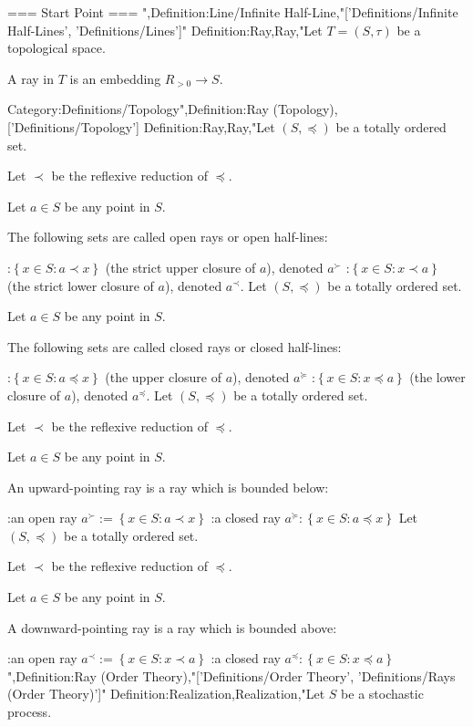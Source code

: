 === Start Point ===
",Definition:Line/Infinite Half-Line,"['Definitions/Infinite Half-Lines', 'Definitions/Lines']"
Definition:Ray,Ray,"Let $T = \left( S, \tau \right)$ be a topological space.


A ray in $T$ is an embedding $R_{>0} \to S$.

Category:Definitions/Topology",Definition:Ray (Topology),['Definitions/Topology']
Definition:Ray,Ray,"Let $\left( S, \preccurlyeq \right)$ be a totally ordered set.

Let $\prec$ be the reflexive reduction of $\preccurlyeq$.

Let $a \in S$ be any point in $S$.


The following sets are called open rays or open half-lines:

:$\left\lbrace x \in S: a \prec x \right\rbrace$ (the strict upper closure of $a$), denoted $a^\succ$
:$\left\lbrace x \in S: x \prec a \right\rbrace$ (the strict lower closure of $a$), denoted $a^\prec$.
Let $\left( S, \preccurlyeq \right)$ be a totally ordered set.

Let $a \in S$ be any point in $S$.


The following sets are called closed rays or closed half-lines:

:$\left\lbrace x \in S: a \preccurlyeq x \right\rbrace$ (the upper closure of $a$), denoted $a^\succcurlyeq$
:$\left\lbrace x \in S: x \preccurlyeq a \right\rbrace$ (the lower closure of $a$), denoted $a^\preccurlyeq$.
Let $\left( S, \preccurlyeq \right)$ be a totally ordered set.

Let $\prec$ be the reflexive reduction of $\preccurlyeq$.

Let $a \in S$ be any point in $S$.


An upward-pointing ray is a ray which is bounded below:

:an open ray $a^\succ:= \left\lbrace x \in S: a \prec x \right\rbrace$
:a closed ray $a^\succcurlyeq: \left\lbrace x \in S: a \preccurlyeq x \right\rbrace$
Let $\left( S, \preccurlyeq \right)$ be a totally ordered set.

Let $\prec$ be the reflexive reduction of $\preccurlyeq$.

Let $a \in S$ be any point in $S$.


A downward-pointing ray is a ray which is bounded above:

:an open ray $a^\prec := \left\lbrace x \in S: x \prec a \right\rbrace$
:a closed ray $a^\preccurlyeq : \left\lbrace x \in S: x \preccurlyeq a \right\rbrace$
",Definition:Ray (Order Theory),"['Definitions/Order Theory', 'Definitions/Rays (Order Theory)']"
Definition:Realization,Realization,"Let $S$ be a stochastic process.

